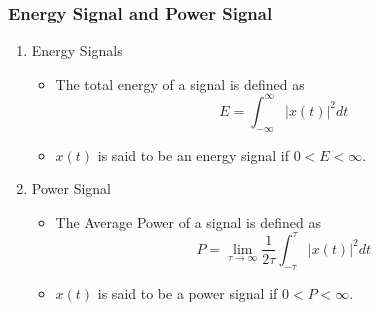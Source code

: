\subsubsection{Energy Signal and Power Signal}
\begin{enumerate}
    \item Energy Signals
    \begin{itemize}
        \item The total energy of a signal is defined as 
        \[E = \int^{\infty}_{-\infty}|x(t)|^2dt\]
        \item $x(t)$ is said to be an energy signal if $0<E<\infty$.
    \end{itemize}
    \item Power Signal
    \begin{itemize}
        \item The Average Power of a signal is defined as
        \[P = \lim_{\tau\rightarrow\infty}\frac{1}{2\tau}\int^{\tau}_{-\tau}|x(t)|^2dt\]
        \item $x(t)$ is said to be a power signal if $0<P<\infty$.
    \end{itemize}
\end{enumerate}

